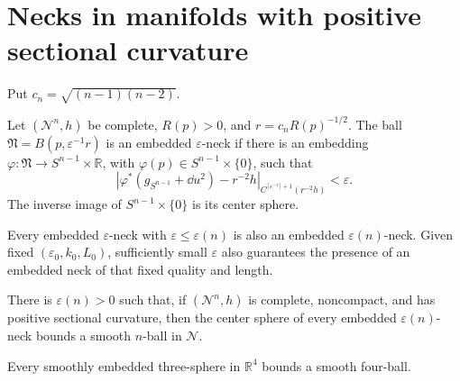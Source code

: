 \section{Necks in manifolds with positive sectional curvature}

Put \(c_n=\sqrt{(n-1)(n-2)}\).

\begin{definition}
\label{def:chow-iii-embedded-epsilon-neck}
Let \((\mathcal N^n,h)\) be complete, \(R(p)>0\), and
\(r=c_nR(p)^{-1/2}\).  The ball \(\mathfrak N=B(p,\varepsilon^{-1}r)\) is an
embedded \(\varepsilon\)-neck if there is an embedding
\(\varphi:\mathfrak N\to S^{n-1}\times\mathbb R\), with
\(\varphi(p)\in S^{n-1}\times\{0\}\), such that
\[
 \left|\varphi^*(g_{S^{n-1}}+\dd u^2)-r^{-2}h\right|_
 {C^{\lceil\varepsilon^{-1}\rceil+1}(r^{-2}h)}<\varepsilon.
\]
The inverse image of \(S^{n-1}\times\{0\}\) is its center sphere.
\end{definition}

\begin{remark}
\label{rem:chow-iii-neck-quality-comparison}
Every embedded \(\varepsilon\)-neck with
\(\varepsilon\le\varepsilon(n)\) is also an embedded
\(\varepsilon(n)\)-neck.  Given fixed \((\varepsilon_0,k_0,L_0)\), sufficiently
small \(\varepsilon\) also guarantees the presence of an embedded neck of
that fixed quality and length.
\end{remark}

\begin{lemma}
\label{lem:chow-iii-neck-center-bounds-ball}
There is \(\varepsilon(n)>0\) such that, if \((\mathcal N^n,h)\) is complete,
noncompact, and has positive sectional curvature, then the center sphere of
every embedded \(\varepsilon(n)\)-neck bounds a smooth \(n\)-ball in
\(\mathcal N\).
\end{lemma}

\begin{example}
\label{ex:chow-iii-smooth-schoenflies-four}
Every smoothly embedded three-sphere in \(\mathbb R^4\) bounds a smooth
four-ball.
\end{example}

